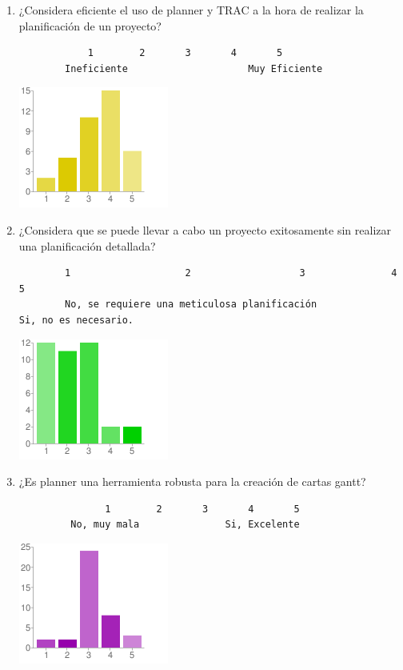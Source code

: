 \begin{enumerate}
	\item ¿Considera eficiente el uso de planner
		y TRAC a la hora de realizar la planificación
		de un proyecto?
		\begin{verbatim}
            1		 2		 3		 4		 5
        Ineficiente						Muy Eficiente
		\end{verbatim}
        \begin{center}
        \includegraphics[scale=0.7]{images/encuesta2/4}
        \end{center}
	\item ¿Considera que se puede llevar a cabo un
		proyecto exitosamente sin realizar una
		planificación detallada?

		\begin{verbatim}
        1					 2					 3				 4					 5
        No, se requiere una meticulosa planificación						Si, no es necesario.
		\end{verbatim}
        \begin{center}
        \includegraphics[scale=0.7]{images/encuesta2/5}
        \end{center}

	\item ¿Es planner una herramienta robusta para
		la creación de cartas gantt?
	
		\begin{verbatim}
               1		2		3		4		5
         No, muy mala				Si, Excelente
		\end{verbatim}
        \begin{center}
        \includegraphics[scale=0.7]{images/encuesta2/6}
        \end{center}
\end{enumerate}

